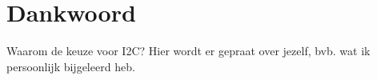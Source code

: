 \chapter*{Dankwoord}

Waarom de keuze voor I2C? Hier wordt er gepraat over jezelf, bvb. wat ik persoonlijk bijgeleerd heb.